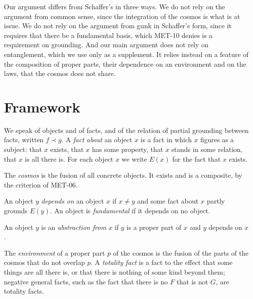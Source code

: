\documentclass{situationist-preprint}
\begin{document}
Our argument differs from Schaffer's in three ways. We do not rely on the argument from common sense, since the integration of the cosmos is what is at issue. We do not rely on the argument from gunk in Schaffer's form, since it requires that there be a fundamental basis, which MET-10 denies is a requirement on grounding. And our main argument does not rely on entanglement, which we use only as a supplement. It relies instead on a feature of the composition of proper parts, their dependence on an environment and on the laws, that the cosmos does not share.

\section{Framework}\label{s:framework}

We speak of objects and of facts, and of the relation of partial grounding between facts, written $f \prec g$. A \emph{fact about} an object $x$ is a fact in which $x$ figures as a subject: that $x$ exists, that $x$ has some property, that $x$ stands in some relation, that $x$ is all there is. For each object $x$ we write $E(x)$ for the fact that $x$ exists.

\begin{definition}[Cosmos]\label{d:cosmos}
The \emph{cosmos} is the fusion of all concrete objects. It exists and is a composite, by the criterion of MET-06.
\end{definition}

\begin{definition}\label{d:fund}
An object $y$ \emph{depends on} an object $x$ if $x \neq y$ and some fact about $x$ partly grounds $E(y)$. An object is \emph{fundamental} if it depends on no object.
\end{definition}

\begin{definition}[Abstraction]\label{d:abstraction}
An object $y$ is an \emph{abstraction from} $x$ if $y$ is a proper part of $x$ and $y$ depends on $x$.
\end{definition}

\begin{definition}\label{d:env}
The \emph{environment} of a proper part $p$ of the cosmos is the fusion of the parts of the cosmos that do not overlap $p$. A \emph{totality fact} is a fact to the effect that some things are all there is, or that there is nothing of some kind beyond them; negative general facts, such as the fact that there is no $F$ that is not $G$, are totality facts.
\end{definition}
\end{document}
